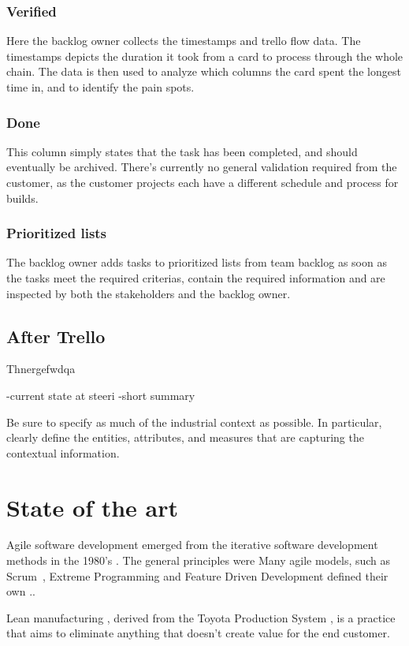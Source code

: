 \documentclass[english]{tktltiki2}
\theoremstyle{definition}
\theoremstyle{remark}
\begin{document}
\subsubsection{Verified}
Here the backlog owner collects the timestamps and trello flow data. The timestamps depicts the duration it took from a card to process through the whole chain. The data is then used to analyze which columns the card spent the longest time in, and to identify the pain spots.
\subsubsection{Done}

This column simply states that the task has been completed, and should eventually be archived. There’s currently no general validation required from the customer, as the customer projects each have a different schedule and process for builds.
\subsubsection{Prioritized lists}

The backlog owner adds tasks to prioritized lists from team backlog as soon as the tasks meet the required criterias, contain the required information and are inspected by both the stakeholders and the backlog owner.

\subsection{After Trello}
Thnergefwdqa

\cite{olsson2012climbing}

-current state at steeri
    -short summary

Be sure to specify as much of the industrial context as possible. In particular,
clearly deﬁne the entities, attributes, and measures that are capturing the contextual information.

\section{State of the art}

Agile software development emerged from the iterative software development methods in the 1980's \cite{}. The general principles were
Many agile models, such as Scrum \cite{}, Extreme Programming \cite{} and Feature Driven Development \cite{} defined their own ..

Lean manufacturing \cite{}, derived from the Toyota Production System \cite{}, is a practice that aims to eliminate anything that doesn't create value for the end customer. 
\end{document}
